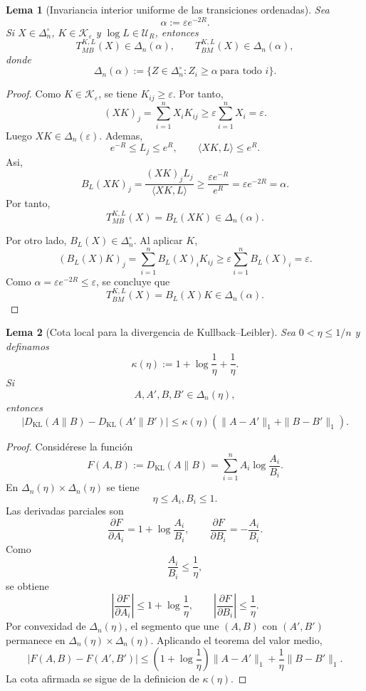 ﻿\documentclass[12pt]{article}
\newtheorem{lema}{Lema}[section]
\begin{document}
\begin{lema}[Invariancia interior uniforme de las transiciones ordenadas]\label{lem:invariancia_interior_transiciones_ordenadas}
Sea
\[
\alpha:=\varepsilon e^{-2R}.
\]
Si \(X\in\Delta_n^\circ\), \(K\in\mathcal K_\varepsilon\) y \(\log L\in\mathcal U_R\), entonces
\[
T_{MB}^{K,L}(X)\in\Delta_n(\alpha),
\qquad
T_{BM}^{K,L}(X)\in\Delta_n(\alpha),
\]
donde
\[
\Delta_n(\alpha)
:=
\{Z\in\Delta_n^\circ:Z_i\ge \alpha\ \text{para todo }i\}.
\]
\end{lema}

\begin{proof}
Como \(K\in\mathcal K_\varepsilon\), se tiene \(K_{ij}\ge\varepsilon\). Por tanto,
\[
(XK)_j
=
\sum_{i=1}^n X_iK_{ij}
\ge
\varepsilon\sum_{i=1}^nX_i
=
\varepsilon.
\]
Luego \(XK\in\Delta_n(\varepsilon)\). Ademas,
\[
e^{-R}\le L_j\le e^R,
\qquad
\langle XK,L\rangle\le e^R.
\]
Asi,
\[
B_L(XK)_j
=
\frac{(XK)_jL_j}{\langle XK,L\rangle}
\ge
\frac{\varepsilon e^{-R}}{e^R}
=
\varepsilon e^{-2R}
=
\alpha.
\]
Por tanto,
\[
T_{MB}^{K,L}(X)=B_L(XK)\in\Delta_n(\alpha).
\]

Por otro lado, \(B_L(X)\in\Delta_n^\circ\). Al aplicar \(K\),
\[
(B_L(X)K)_j
=
\sum_{i=1}^n B_L(X)_iK_{ij}
\ge
\varepsilon\sum_{i=1}^n B_L(X)_i
=
\varepsilon.
\]
Como \(\alpha=\varepsilon e^{-2R}\le\varepsilon\), se concluye que
\[
T_{BM}^{K,L}(X)=B_L(X)K\in\Delta_n(\alpha).
\]
\end{proof}

\begin{lema}[Cota local para la divergencia de Kullback--Leibler]\label{lem:cota_local_KL}
Sea \(0<\eta\le 1/n\) y definamos
\[
\kappa(\eta)
:=
1+\log\frac1\eta+\frac1\eta.
\]
Si
\[
A,A',B,B'\in\Delta_n(\eta),
\]
entonces
\[
\left|
D_{\mathrm{KL}}(A\|B)
-
D_{\mathrm{KL}}(A'\|B')
\right|
\le
\kappa(\eta)
\left(
\|A-A'\|_1+\|B-B'\|_1
\right).
\]
\end{lema}

\begin{proof}
Considérese la función
\[
F(A,B):=D_{\mathrm{KL}}(A\|B)
=
\sum_{i=1}^n A_i\log\frac{A_i}{B_i}.
\]
En \(\Delta_n(\eta)\times\Delta_n(\eta)\) se tiene
\[
\eta\le A_i,B_i\le 1.
\]
Las derivadas parciales son
\[
\frac{\partial F}{\partial A_i}
=
1+\log\frac{A_i}{B_i},
\qquad
\frac{\partial F}{\partial B_i}
=
-\frac{A_i}{B_i}.
\]
Como
\[
\frac{A_i}{B_i}\le \frac1\eta,
\]
se obtiene
\[
\left|
\frac{\partial F}{\partial A_i}
\right|
\le
1+\log\frac1\eta,
\qquad
\left|
\frac{\partial F}{\partial B_i}
\right|
\le
\frac1\eta.
\]
Por convexidad de \(\Delta_n(\eta)\), el segmento que une \((A,B)\) con \((A',B')\) permanece en \(\Delta_n(\eta)\times\Delta_n(\eta)\). Aplicando el teorema del valor medio,
\[
|F(A,B)-F(A',B')|
\le
\left(1+\log\frac1\eta\right)\|A-A'\|_1
+
\frac1\eta\|B-B'\|_1.
\]
La cota afirmada se sigue de la definicion de \(\kappa(\eta)\).
\end{proof}
\end{document}
